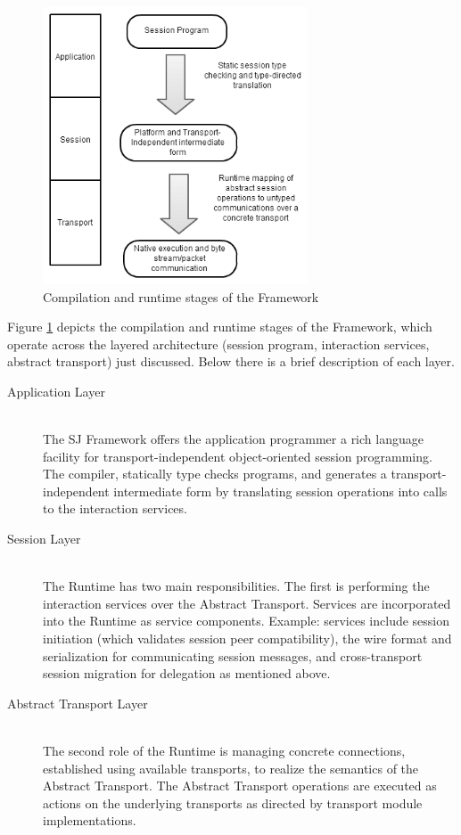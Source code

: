 \begin{figure}
    \centering
    \includegraphics[width=0.7\textwidth]{resources/concept_sj_framework.png}
    \caption{Compilation and runtime stages of the Framework}
    \label{fig:image1}
\end{figure}

Figure \ref{fig:image1} depicts the compilation and runtime stages of the Framework, which operate across the layered architecture (session program, interaction services, abstract transport) just discussed. Below there is a brief description of each layer.

\begin{description}
\item[Application Layer] \hfill \\
The SJ Framework offers the application programmer a rich language facility for transport-independent object-oriented session programming. The compiler, statically type checks programs, and generates a transport-independent intermediate form by translating session operations into calls to the interaction services.

\item[Session Layer] \hfill \\
The Runtime has two main responsibilities. The first is performing the interaction services over the Abstract Transport. Services are incorporated into the Runtime as service components. Example: services include session initiation (which validates session peer compatibility), the wire format and serialization for communicating session messages, and cross-transport session migration for delegation as mentioned above.

\item[Abstract Transport Layer] \hfill \\
The second role of the Runtime is managing concrete connections, established using available transports, to realize the semantics of the Abstract Transport. The Abstract Transport operations are executed as actions on the underlying transports as directed by transport module implementations.
\end{description}

